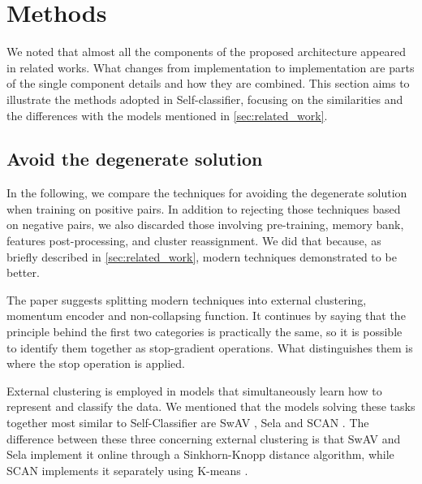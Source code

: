 \documentclass{article}
\begin{document}
\section{Methods}
\label{sec:methods}
We noted that almost all the components of the proposed architecture appeared in related works. What changes from implementation to implementation are parts of the single component details and how they are combined. This section aims to illustrate the methods adopted in Self-classifier, focusing on the similarities and the differences with the models mentioned in \autoref{sec:related_work}.

\subsection{Avoid the degenerate solution}
\label{subsec:degenerate_solution}
In the following, we compare the techniques for avoiding the degenerate solution when training on positive pairs. In addition to rejecting those techniques based on negative pairs, we also discarded those involving pre-training, memory bank, features post-processing, and cluster reassignment. We did that because, as briefly described in \autoref{sec:related_work}, modern techniques demonstrated to be better.

The paper suggests splitting modern techniques into external clustering, momentum encoder and non-collapsing function. It continues by saying that the principle behind the first two categories is practically the same, so it is possible to identify them together as stop-gradient operations. What distinguishes them is where the stop operation is applied.

External clustering is employed in models that simultaneously learn how to represent and classify the data. We mentioned that the models solving these tasks together most similar to Self-Classifier are SwAV \cite{swav}, Sela \cite{sela} and SCAN \cite{scan}. The difference between these three concerning external clustering is that SwAV and Sela implement it online through a Sinkhorn-Knopp distance algorithm, while SCAN implements it separately using K-means \cite{self_classifier}.
\end{document}
